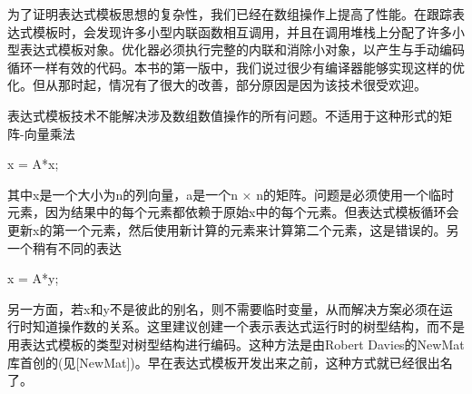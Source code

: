 为了证明表达式模板思想的复杂性，我们已经在数组操作上提高了性能。在跟踪表达式模板时，会发现许多小型内联函数相互调用，并且在调用堆栈上分配了许多小型表达式模板对象。优化器必须执行完整的内联和消除小对象，以产生与手动编码循环一样有效的代码。本书的第一版中，我们说过很少有编译器能够实现这样的优化。但从那时起，情况有了很大的改善，部分原因是因为该技术很受欢迎。

表达式模板技术不能解决涉及数组数值操作的所有问题。不适用于这种形式的矩阵-向量乘法

x = A*x;

其中x是一个大小为n的列向量，a是一个n × n的矩阵。问题是必须使用一个临时元素，因为结果中的每个元素都依赖于原始x中的每个元素。但表达式模板循环会更新x的第一个元素，然后使用新计算的元素来计算第二个元素，这是错误的。另一个稍有不同的表达

x = A*y;

另一方面，若x和y不是彼此的别名，则不需要临时变量，从而解决方案必须在运行时知道操作数的关系。这里建议创建一个表示表达式运行时的树型结构，而不是用表达式模板的类型对树型结构进行编码。这种方法是由Robert Davies的NewMat库首创的(见[NewMat])。早在表达式模板开发出来之前，这种方式就已经很出名了。

















































